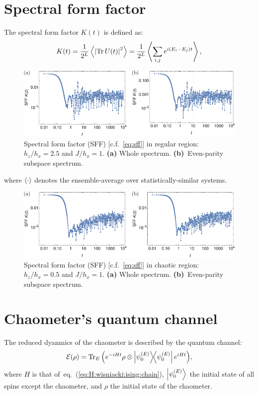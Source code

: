 \documentclass[10pt,letterpaper]{article}
\newcommand{\eref}[1]{eq.~(\ref{#1})}
\newcommand{\mcE}{\mathcal E}
\begin{document}
\section{Spectral form factor}
The spectral form factor $K(t)$ is defined as:
\begin{equation}\label{eq:sff}
K(t) = 
\frac{1}{2^L}
\expval{
\abs{\Tr U(t) }^2
} = 
\frac{1}{2^L}
\expval{
\sum_{i,j} 
e^{i(E_i - E_j) t}
},
\end{equation}
\begin{figure}
\centering
\includegraphics[width=\textwidth]{sff_regular.pdf}
\caption{Spectral form factor (SFF) [c.f.~\eqref{eq:sff}] in regular region: $h_z/h_x=2.5$ and 
$J/h_x=1$. \textbf{(a)} Whole spectrum. \textbf{(b)}~Even-parity subspace 
spectrum.}
\label{fig:sff:regular}
\end{figure}
where $\expval{\cdot}$ denotes the ensemble-average over statistically-similar
systems.

\begin{figure}
\centering
\includegraphics[width=\textwidth]{sff_chaotic.pdf}
\caption{Spectral form factor (SFF) [c.f.~\eqref{eq:sff}] in chaotic region: $h_z/h_x=0.5$ and 
$J/h_x=1$. \textbf{(a)} Whole spectrum. \textbf{(b)}~Even-parity subspace 
spectrum.}
\label{fig:sff:chaotic}
\end{figure}

\section{Chaometer's quantum channel}
The reduced dyanmics of the chaometer is described by the quantum channel: 
\begin{equation}
\mcE(\rho) = 
\Tr_E \qty(
e^{-i H t}
\rho \otimes \dyad{\psi_0^{(E)}}
e^{i H t}
),
\end{equation}
where $H$ is that of~\eref{eq:H:wisniacki:ising:chain}, $\ket{\psi_0^{(E)}}$
the initial state of all spins except the chaometer, and $\rho$ the initial 
state of the chaometer. 
\end{document}
